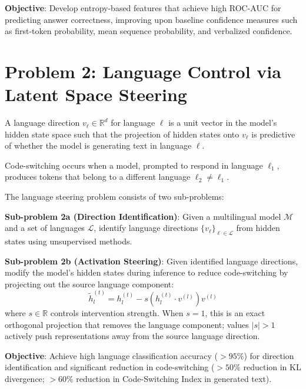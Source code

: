 \textbf{Objective}: Develop entropy-based features that achieve high ROC-AUC for predicting answer correctness, improving upon baseline confidence measures such as first-token probability, mean sequence probability, and verbalized confidence.

\section{Problem 2: Language Control via Latent Space Steering}

\begin{Def}
A language direction $v_\ell \in \mathbb{R}^d$ for language $\ell$ is a unit vector in the model's hidden state space such that the projection of hidden states onto $v_\ell$ is predictive of whether the model is generating text in language $\ell$.
\end{Def}

\begin{Def}
Code-switching occurs when a model, prompted to respond in language $\ell_1$, produces tokens that belong to a different language $\ell_2 \neq \ell_1$.
\end{Def}

The language steering problem consists of two sub-problems:

\textbf{Sub-problem 2a (Direction Identification)}: Given a multilingual model $\mathcal{M}$ and a set of languages $\mathcal{L}$, identify language directions $\{v_\ell\}_{\ell \in \mathcal{L}}$ from hidden states using unsupervised methods.

\textbf{Sub-problem 2b (Activation Steering)}: Given identified language directions, modify the model's hidden states during inference to reduce code-switching by projecting out the source language component:
\begin{equation}
    \tilde{h}_l^{(t)} = h_l^{(t)} - s \left(h_l^{(t)} \cdot v^{(l)}\right) v^{(l)}
    \label{eq:steering}
\end{equation}
where $s \in \mathbb{R}$ controls intervention strength. When $s = 1$, this is an exact orthogonal projection that removes the language component; values $|s| > 1$ actively push representations away from the source language direction.

\textbf{Objective}: Achieve high language classification accuracy ($>95\%$) for direction identification and significant reduction in code-switching ($>50\%$ reduction in KL divergence; $>60\%$ reduction in Code-Switching Index in generated text).

